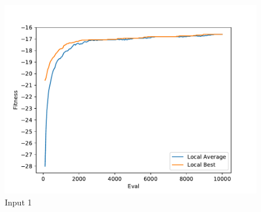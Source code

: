 \documentclass{standalone}
\begin{document}
\begin{figure}[!htb]
	\caption{Input 1}
	\label{fig:graph_1010}
	\includegraphics[width=\textwidth]{../graphs/graphs/1010.pdf}
\end{figure}
\end{document}
